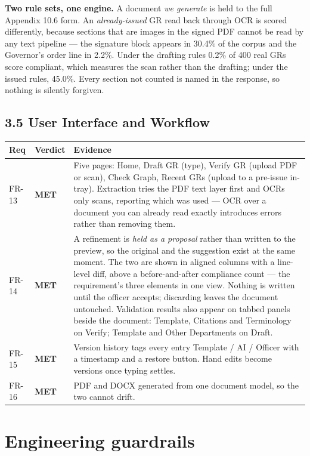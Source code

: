 \documentclass[11pt,a4paper]{article}
\newcommand{\MET}{\textcolor{ok}{\textbf{MET}}}
\begin{document}
\textbf{Two rule sets, one engine.} A document \emph{we generate} is held to the full Appendix
10.6 form. An \emph{already-issued} GR read back through OCR is scored differently, because
sections that are images in the signed PDF cannot be read by any text pipeline --- the signature
block appears in 30.4\% of the corpus and the Governor's order line in 2.2\%. Under the drafting
rules 0.2\% of 400 real GRs score compliant, which measures the scan rather than the drafting;
under the issued rules, 45.0\%. Every section not counted is named in the response, so nothing is
silently forgiven.

\subsection*{3.5 User Interface and Workflow}

\begin{longtable}{@{}p{11mm}p{15mm}p{125mm}@{}}
\toprule
\textbf{Req} & \textbf{Verdict} & \textbf{Evidence} \\
\midrule
\endhead
FR-13 & \MET &
Five pages: Home, Draft GR (type), Verify GR (upload PDF or scan), Check Graph, Recent GRs
(upload to a pre-issue in-tray). Extraction tries the PDF text layer first and OCRs only scans,
reporting which was used --- OCR over a document you can already read exactly introduces errors
rather than removing them. \\
\addlinespace
FR-14 & \MET &
A refinement is \emph{held as a proposal} rather than written to the preview, so the original and
the suggestion exist at the same moment. The two are shown in aligned columns with a line-level
diff, above a before-and-after compliance count --- the requirement's three elements in one
view. Nothing is written until the officer accepts; discarding leaves the document untouched.
Validation results also appear on tabbed panels beside the document: Template, Citations and
Terminology on Verify; Template and Other Departments on Draft. \\
\addlinespace
FR-15 & \MET &
Version history tags every entry Template / AI / Officer with a timestamp and a restore button.
Hand edits become versions once typing settles. \\
\addlinespace
FR-16 & \MET &
PDF and DOCX generated from one document model, so the two cannot drift. \\
\bottomrule
\end{longtable}

\section{Engineering guardrails}
\end{document}
